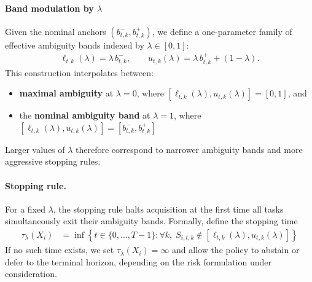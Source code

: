 \paragraph{Band modulation by $\lambda$}
Given the nominal anchors $(b^-_{t,k}, b^+_{t,k})$, we define a one-parameter family of effective ambiguity bands indexed by $\lambda\in[0,1]$:
\begin{align}
\label{eq:sym_bands_main}
\ell_{t,k}(\lambda)=\lambda\, b^-_{t,k},
\qquad
u_{t,k}(\lambda)=\lambda\, b^+_{t,k} + (1-\lambda).
\end{align}
This construction interpolates between:
\begin{itemize}
    \item \textbf{maximal ambiguity} at $\lambda=0$, where $[\ell_{t,k}(\lambda),u_{t,k}(\lambda)]=[0,1]$, and
    \item the \textbf{nominal ambiguity band} at $\lambda=1$, where $[\ell_{t,k}(\lambda),u_{t,k}(\lambda)]=[b^-_{t,k},b^+_{t,k}]$
\end{itemize}
Larger values of $\lambda$ therefore correspond to narrower ambiguity bands and more aggressive stopping rules.


\paragraph{Stopping rule.}
For a fixed $\lambda$, the stopping rule halts acquisition at the first time all tasks simultaneously exit their ambiguity bands. Formally, define the stopping time
\begin{align*}
\tau_\lambda(X_i) &= \inf\left\{t\in\{0,\dots,T-1\}: \forall k,\;
                    S_{i,t,k}\notin [\ell_{t,k}(\lambda),u_{t,k}(\lambda)]\right\}
\end{align*}
If no such time exists, we set $\tau_\lambda(X_i)=\infty$ and allow the policy to abstain or defer to the terminal horizon, depending on the risk formulation under consideration.


